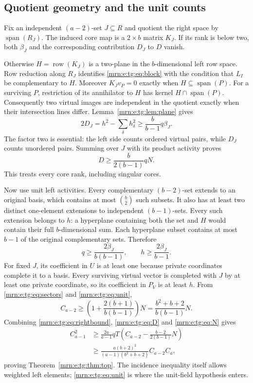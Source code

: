 \documentclass[11pt,a4paper]{article}
\theoremstyle{remark}\newtheorem{remark}[theorem]{Remark}
\newcommand{\spn}{\operatorname{span}}     %
\begin{document}
\subsection{Quotient geometry and the unit counts}
Fix an independent $(a-2)$-set $J\subseteq R$ and quotient the right space by $\spn(R_J)$. The induced core map is a $2\times b$ matrix $K_J$. If its rank is below two, both $\beta_J$ and the corresponding contribution $D_J$ to $D$ vanish.

Otherwise $H=\operatorname{row}(K_J)$ is a two-plane in the $b$-dimensional left row space. Row reduction along $R_J$ identifies \eqref{mrn:e:tg:eq:block} with the condition that $L_I$ be complementary to $H$. Moreover $K_Jv_P=0$ exactly when $H\subseteq\spn(P)$. For a surviving $P$, restriction of its annihilator to $H$ has kernel $H\cap\spn(P)$. Consequently two virtual images are independent in the quotient exactly when their intersection lines differ. Lemma~\ref{mrn:e:tg:lem:plane} gives
\[
 2D_J=h^2-\sum_\delta h_\delta^2\ge\frac{b}{b-1}q\beta_J.
\]
The factor two is essential: the left side counts ordered virtual pairs, while $D_J$ counts unordered pairs. Summing over $J$ with its product activity proves
\begin{equation}\label{mrn:e:tg:eq:D}
 D\ge\frac{b}{2(b-1)}qN.
\end{equation}
This treats every core rank, including singular cores.

Now use unit left activities. Every complementary $(b-2)$-set extends to an original basis, which contains at most $\binom b2$ such subsets. It also has at least two distinct one-element extensions to independent $(b-1)$-sets. Every such extension belongs to $h$: a hyperplane containing both the set and $H$ would contain their full $b$-dimensional sum. Each hyperplane subset contains at most $b-1$ of the original complementary sets. Therefore
\begin{equation}\label{mrn:e:tg:eq:unit}
 q\ge\frac{2\beta_J}{b(b-1)},\qquad
 h\ge\frac{2\beta_J}{b-1}.
\end{equation}
For fixed $J$, its coefficient in $U$ is at least one because private coordinates complete it to a basis. Every surviving virtual vector is completed with $J$ by at least one private coordinate, so its coefficient in $P_V$ is at least $h$. From \eqref{mrn:e:tg:eq:sectors} and \eqref{mrn:e:tg:eq:unit},
\begin{equation}\label{mrn:e:tg:eq:N}
 C_{a-2}\ge\left(1+\frac{2(b+1)}{b(b-1)}\right)N
 =\frac{b^2+b+2}{b(b-1)}N.
\end{equation}
Combining \eqref{mrn:e:tg:eq:rightbound}, \eqref{mrn:e:tg:eq:D} and \eqref{mrn:e:tg:eq:N} gives
\begin{align*}
 C_{a-1}^2
 &\ge\frac{2a}{a-1}qT\left(C_{a-2}-\frac{b-2}{2(b-1)}N\right)\\
 &\ge\frac{a(b+2)^2}{(a-1)(b^2+b+2)}C_{a-2}C_a,
\end{align*}
proving Theorem~\ref{mrn:e:tg:thm:top}. The incidence inequality itself allows weighted left elements; \eqref{mrn:e:tg:eq:unit} is where the unit-field hypothesis enters.
\end{document}
